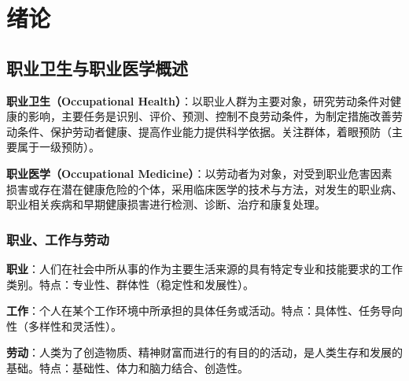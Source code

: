 \chapter{绪论}
\setcounter{chapter}{1}

\section{职业卫生与职业医学概述}

\begin{defbox}
\textbf{职业卫生（Occupational Health）}：以职业人群为主要对象，研究劳动条件对健康的影响，主要任务是识别、评价、预测、控制不良劳动条件，为制定措施改善劳动条件、保护劳动者健康、提高作业能力提供科学依据。关注群体，着眼预防（主要属于一级预防）。

\textbf{职业医学（Occupational Medicine）}：以劳动者为对象，对受到职业危害因素损害或存在潜在健康危险的个体，采用临床医学的技术与方法，对发生的职业病、职业相关疾病和早期健康损害进行检测、诊断、治疗和康复处理。
\end{defbox}

\subsection{职业、工作与劳动}

\begin{defbox}
\textbf{职业}：人们在社会中所从事的作为主要生活来源的具有特定专业和技能要求的工作类别。特点：专业性、群体性（稳定性和发展性）。

\textbf{工作}：个人在某个工作环境中所承担的具体任务或活动。特点：具体性、任务导向性（多样性和灵活性）。

\textbf{劳动}：人类为了创造物质、精神财富而进行的有目的的活动，是人类生存和发展的基础。特点：基础性、体力和脑力结合、创造性。
\end{defbox}

